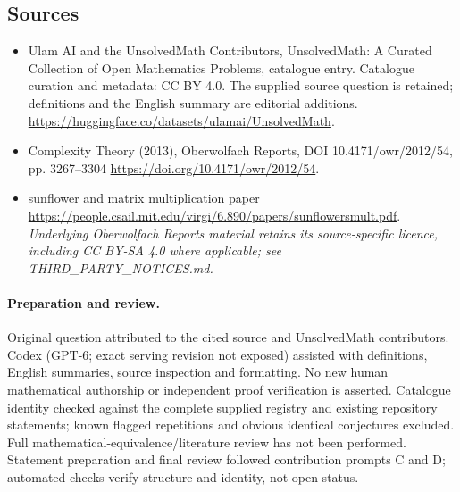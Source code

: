\documentclass[11pt]{article}
\begin{document}
\subsection{Sources}
\begin{itemize}
\item[\hypertarget{source:statement:1}{S1}] Ulam AI and the UnsolvedMath Contributors, UnsolvedMath: A Curated Collection of Open Mathematics Problems, catalogue entry. Catalogue curation and metadata: CC BY 4.0. The supplied source question is retained; definitions and the English summary are editorial additions.
\url{https://huggingface.co/datasets/ulamai/UnsolvedMath}.
\item[\hypertarget{source:statement:2}{S2}] Complexity Theory (2013), Oberwolfach Reports, DOI 10.4171/owr/2012/54, pp. 3267--3304
\url{https://doi.org/10.4171/owr/2012/54}.
\item[\hypertarget{source:statement:3}{S3}] sunflower and matrix multiplication paper
\url{https://people.csail.mit.edu/virgi/6.890/papers/sunflowersmult.pdf}.
\textit{Underlying Oberwolfach Reports material retains its source-specific licence, including CC BY-SA 4.0 where applicable; see THIRD\_PARTY\_NOTICES.md.}
\end{itemize}
\paragraph{Preparation and review.}
Original question attributed to the cited source and UnsolvedMath contributors. Codex (GPT-6; exact serving revision not exposed) assisted with definitions, English summaries, source inspection and formatting. No new human mathematical authorship or independent proof verification is asserted. Catalogue identity checked against the complete supplied registry and existing repository statements; known flagged repetitions and obvious identical conjectures excluded. Full mathematical-equivalence/literature review has not been performed. Statement preparation and final review followed contribution prompts C and D; automated checks verify structure and identity, not open status.
\label{end:statement}
\end{document}
